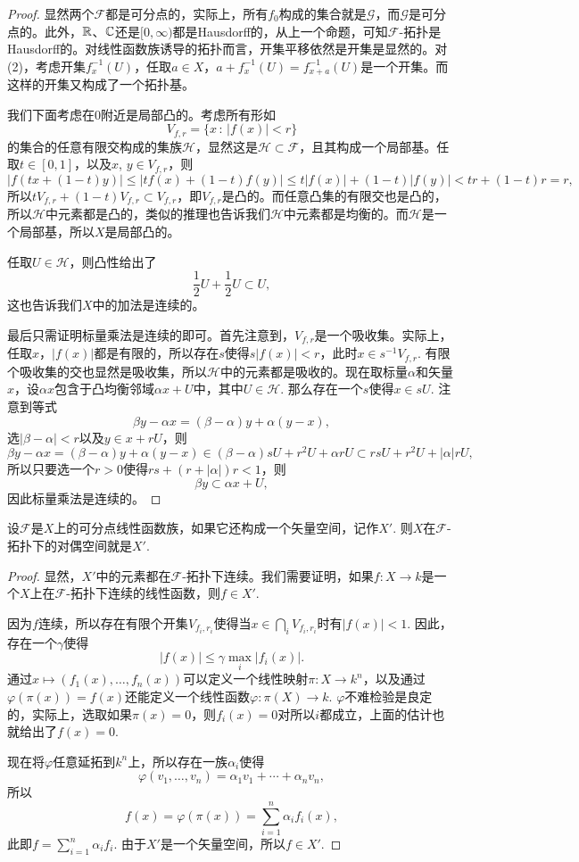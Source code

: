 \begin{proof}
显然两个$\mathscr{F}$都是可分点的，实际上，所有$f_0$构成的集合就是$\mathscr{G}$，而$\mathscr{G}$是可分点的。此外，$\mathbb{R}$、$\mathbb{C}$还是$[0,\infty)$都是Hausdorff的，从上一个命题，可知$\mathscr{F}$-拓扑是Hausdorff的。对线性函数族诱导的拓扑而言，开集平移依然是开集是显然的。对(2)，考虑开集$f^{-1}_x(U)$，任取$a\in X$，$a+f^{-1}_x(U)=f^{-1}_{x+a}(U)$是一个开集。而这样的开集又构成了一个拓扑基。

我们下面考虑在$0$附近是局部凸的。考虑所有形如
\[
	V_{f,r}=\{x\,:\, |f(x)|<r\}
\]
的集合的任意有限交构成的集族$\mathscr{H}$，显然这是$\mathscr{H}\subset  \mathscr{F}$，且其构成一个局部基。任取$t\in [0,1]$，以及$x$, $y\in V_{f,r}$，则
\[
	|f(tx+(1-t)y)|\leq |tf(x)+(1-t)f(y)|\leq t|f(x)|+(1-t)|f(y)|<tr+(1-t)r=r,
\]
所以$tV_{f,r}+(1-t)V_{f,r}\subset V_{f,r}$，即$V_{f,r}$是凸的。而任意凸集的有限交也是凸的，所以$\mathscr{H}$中元素都是凸的，类似的推理也告诉我们$\mathscr{H}$中元素都是均衡的。而$\mathscr{H}$是一个局部基，所以$X$是局部凸的。

任取$U\in \mathscr{H}$，则凸性给出了
\[
	\frac{1}{2}U+\frac{1}{2}U\subset U,
\]
这也告诉我们$X$中的加法是连续的。

最后只需证明标量乘法是连续的即可。首先注意到，$V_{f,r}$是一个吸收集。实际上，任取$x$，$|f(x)|$都是有限的，所以存在$s$使得$s|f(x)|<r$，此时$x\in s^{-1}V_{f,r}$. 有限个吸收集的交也显然是吸收集，所以$\mathscr{H}$中的元素都是吸收的。现在取标量$\alpha$和矢量$x$，设$\alpha x$包含于凸均衡邻域$\alpha x+U$中，其中$U\in \mathscr{H}$. 那么存在一个$s$使得$x\in sU$. 注意到等式
\[
	\beta y -\alpha x = (\beta-\alpha)y+\alpha(y-x),
\]
选$|\beta-\alpha|<r$以及$y\in x + rU$，则
\[
	\beta y -\alpha x = (\beta-\alpha)y+\alpha(y-x)\in (\beta-\alpha)sU+r^2U+\alpha rU\subset rsU+r^2U+|\alpha| rU,
\]
所以只要选一个$r>0$使得$rs+(r+|\alpha|)r<1$，则
\[
	\beta y \subset \alpha x+U,
\]
因此标量乘法是连续的。
\end{proof}

\begin{pro}\label{pro:1.46}
设$\mathscr{F}$是$X$上的可分点线性函数族，如果它还构成一个矢量空间，记作$X'$. 则$X$在$\mathscr{F}$-拓扑下的对偶空间就是$X'$.
\end{pro}

\begin{proof}
显然，$X'$中的元素都在$\mathscr{F}$-拓扑下连续。我们需要证明，如果$f:X\to k$是一个$X$上在$\mathscr{F}$-拓扑下连续的线性函数，则$f\in X'$.

因为$f$连续，所以存在有限个开集$V_{f_i,r_i}$使得当$x\in \bigcap_i V_{f_i,r_i}$时有$|f(x)|<1$. 因此，存在一个$\gamma$使得
\[
	|f(x)|\leq  \gamma \max_{i}|f_i(x)|.
\]
通过$x\mapsto (f_1(x),\dots,f_n(x))$可以定义一个线性映射$\pi:X\to k^n$，以及通过$\varphi(\pi(x))=f(x)$还能定义一个线性函数$\varphi:\pi(X)\to k$. $\varphi$不难检验是良定的，实际上，选取如果$\pi(x)=0$，则$f_i(x)=0$对所以$i$都成立，上面的估计也就给出了$f(x)=0$.

现在将$\varphi$任意延拓到$k^n$上，所以存在一族$\alpha_i$使得
\[
	\varphi(v_1,\dots,v_n)=\alpha_1v_1+\cdots+\alpha_nv_n,
\]
所以
\[
	f(x)=\varphi(\pi(x))=\sum_{i=1}^n \alpha_i f_i(x),
\]
此即$f=\sum_{i=1}^n \alpha_if_i$. 由于$X'$是一个矢量空间，所以$f\in X'$.
\end{proof}

